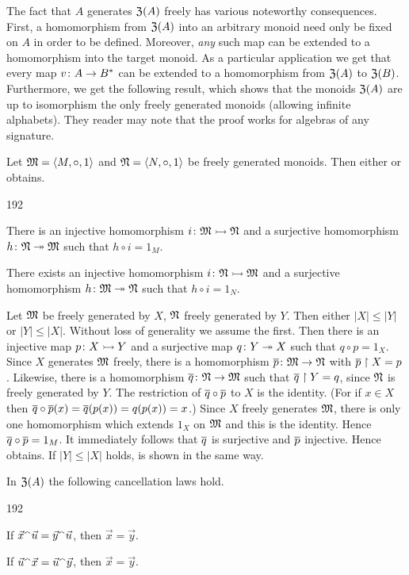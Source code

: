 The fact that $A$ generates $\mathfrak{Z}(A)$ freely has various noteworthy
consequences. First, a homomorphism from $\mathfrak{Z}(A)$ into an
arbitrary monoid need only be fixed on $A$ in order to be defined.
Moreover, {\it any\/} such map can be extended to a homomorphism
into the target monoid. As a particular application we get that
every map $v \colon A \rightarrow B^{\ast}$ can be extended to a homomorphism
from $\mathfrak{Z}(A)$ to $\mathfrak{Z}(B)$. Furthermore, we get the following result, 
which shows that the monoids $\mathfrak{Z}(A)$ are up to isomorphism the only 
freely generated monoids (allowing infinite alphabets). They reader 
may note that the proof works for algebras of any signature.
\begin{thm}
Let $\mathfrak{M} = \langle M, \circ, 1\rangle$ and $\mathfrak{N} = \langle N, \circ, 1\rangle$
be freely generated mo\-no\-ids. Then either  or 
obtains.
\renewcommand{\labelenumi}{(\alph{enumi})}
\begin{dingautolist}{192}
\item
There is an injective homomorphism $i \colon \mathfrak{M} \rightarrowtail \mathfrak{N}$ and a
surjective homomorphism $h \colon \mathfrak{N} \twoheadrightarrow \mathfrak{M}$ such that $h \circ i = 1_M$.
\item
There exists an injective homomorphism $i \colon \mathfrak{N} \rightarrowtail \mathfrak{M}$ and a
surjective homomorphism $h \colon \mathfrak{M} \twoheadrightarrow \mathfrak{N}$ such that $h \circ i = 1_N$.
\end{dingautolist}
\end{thm}
\proofbeg Let $\mathfrak{M}$ be freely generated by $X$, $\mathfrak{N}$ freely
generated by $Y$. Then either $|X| \leq |Y|$ or $|Y| \leq |X|$.
Without loss of generality we assume the first. Then there is an
injective map $p \colon X \rightarrowtail Y$ and a surjective map $q \colon Y \twoheadrightarrow X$
such that $q \circ p = 1_X$. Since $X$ generates $\mathfrak{M}$ freely,
there is a homomorphism $\overline{p} \colon \mathfrak{M} \rightarrow \mathfrak{N}$ with $\overline{p}
\restriction X = p$. Likewise, there is a homomorphism $\overline{q} \colon
\mathfrak{N} \rightarrow \mathfrak{M}$ such that $\overline{q} \restriction Y = q$, since $\mathfrak{N}$
is freely generated by $Y$. The restriction of $\overline{q} \circ
\overline{p}$ to $X$ is the identity. (For if $x \in X$ then $\overline{q}
\circ \overline{p}(x) = \overline{q}(p(x)) = q(p(x)) = x$.) Since $X$ 
freely generates $\mathfrak{M}$, there is only one homomorphism
which extends $1_X$ on $\mathfrak{M}$ and this is the identity. Hence
$\overline{q} \circ \overline{p} = 1_M$. It immediately follows that
$\overline{q}$ is surjective and $\overline{p}$ injective. Hence 
 obtains. If $|Y| \leq |X|$ holds,  is 
shown in the same way.
\proofend
\begin{thm}
In $\mathfrak{Z}(A)$ the following cancellation laws hold.
\begin{dingautolist}{192}
\item
If $\vec{x} {^{\smallfrown}} \vec{u} = \vec{y} {^{\smallfrown}} \vec{u}$,
then $\vec{x} = \vec{y}$.
\item
If $\vec{u} {^{\smallfrown}} \vec{x} = \vec{u} {^{\smallfrown}} \vec{y}$,
then $\vec{x} = \vec{y}$.
\end{dingautolist}
\end{thm}
